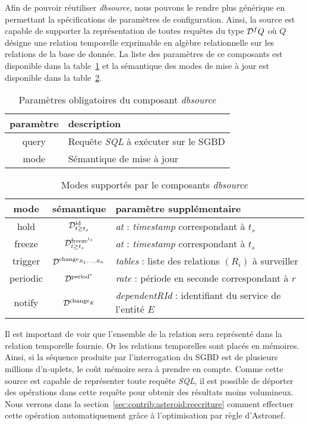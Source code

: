 Afin de pouvoir réutiliser \textit{dbsource}, nous pouvons le rendre plus générique en permettant la spécifications de paramètres de configuration. Ainsi, la source est capable de supporter la représentation de toutes requêtes du type $\mathcal{D}^f Q$ où $Q$ désigne une relation temporelle exprimable en algèbre relationnelle sur les relations de la base de donnée. La liste des paramètres de ce composants est disponible dans la table~\ref{tab:contrib:asteroid:dbsource} et la sémantique des modes de mise à jour est disponible dans la table~\ref{tab:contrib:asteroid:dbsource:modes}.
\begin{table}[ht]
    \centering
    \begin{tabular}{cl}
        paramètre & description \\ \midrule
        query & Requête \textit{SQL} à exécuter sur le SGBD \\
        mode & Sémantique de mise à jour
    \end{tabular}
    \caption{Paramètres obligatoires du composant \textit{dbsource}}\label{tab:contrib:asteroid:dbsource}
\end{table}
\begin{table}[ht]
    \centering
    \begin{tabular}{ccl}
        mode & sémantique & paramètre supplémentaire \\ \midrule
        hold & $\mathcal{D}^{\mathrm{id}}_{t\geq t_s}$ & \textit{at} : \textit{timestamp} correspondant à $t_s$ \\
        freeze & $\mathcal{D}^{\mathrm{freeze}^{t_s}}_{t\geq t_s}$ & \textit{at} : \textit{timestamp} correspondant à $t_s$\\
        trigger & $\mathcal{D}^{\mathrm{change}_{R_1,...,R_n}}$ & \textit{tables} : liste des relations $(R_i)$ à surveiller \\
        periodic & $\mathcal{D}^{\mathrm{period}^{r}}$ & \textit{rate} : période en seconde correspondant à $r$\\
        notify & $\mathcal{D}^{\mathrm{change}_{E}}$ & \textit{dependentRId} : identifiant du service de l'entité $E$
    \end{tabular}
    \caption{Modes supportés par le composants \textit{dbsource}}\label{tab:contrib:asteroid:dbsource:modes}
\end{table}

Il est important de voir que l'ensemble de la relation sera représenté dans la relation temporelle fournie. Or les relations temporelles sont placés en mémoires. Ainsi, si la séquence produite par l'interrogation du SGBD est de plusieurs millions d'n-uplets, le coût mémoire sera à prendre en compte. Comme cette source est capable de représenter toute requête \textit{SQL}, il est possible de déporter des opérations dans cette requête pour obtenir des résultats moins volumineux. Nous verrons dans la section~\ref{sec:contrib:asteroid:reecriture} comment effectuer cette opération automatiquement grâce à l'optimisation par règle d'Astronef.

